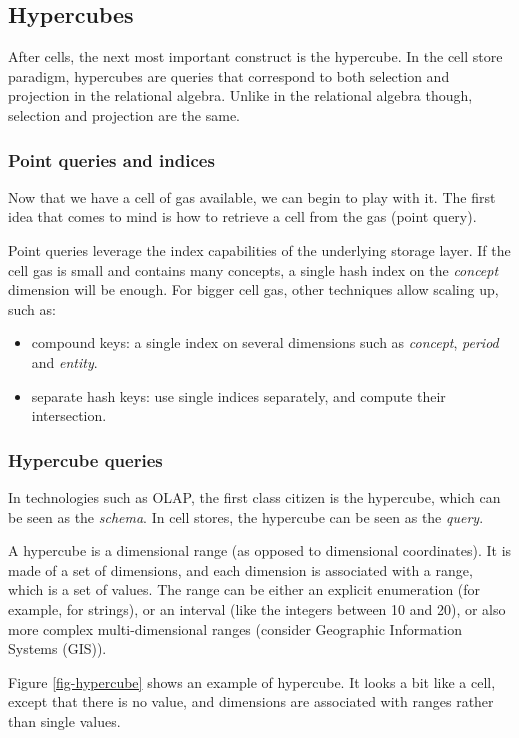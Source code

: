 \documentclass{acm_proc_article-sp}
\begin{document}
\subsection{Hypercubes}

After cells, the next most important construct is the hypercube. In the cell store paradigm, hypercubes are queries that correspond to both selection and projection in the relational algebra. Unlike in the relational algebra though, selection and projection are the same.

\subsubsection{Point queries and indices}

Now that we have a cell of gas available, we can begin to play with it. The first idea that comes to mind is how to retrieve a cell from the gas (point query).

Point queries leverage the index capabilities of the underlying storage layer. If the cell gas is small and contains many concepts, a single hash index on the \emph{concept} dimension will be enough. For bigger cell gas, other techniques allow scaling up, such as:
\begin{itemize}
\item compound keys: a single index on several dimensions such as \emph{concept}, \emph{period} and \emph{entity}.
\item separate hash keys: use single indices separately, and compute their intersection.
\end{itemize}

\subsubsection{Hypercube queries}
In technologies such as OLAP, the first class citizen is the hypercube, which can be seen as the \emph{schema}. In cell stores, the hypercube can be seen as the \emph{query}.

A hypercube is a dimensional range (as opposed to dimensional coordinates). It is made of a set of dimensions, and each dimension is associated with a range, which is a set of values. The range can be either an explicit enumeration (for example, for strings), or an interval (like the integers between 10 and 20), or also more complex multi-dimensional ranges (consider Geographic Information Systems (GIS)).

Figure \ref{fig-hypercube} shows an example of hypercube. It looks a bit like a cell, except that there is no value, and dimensions are associated with ranges rather than single values.
\end{document}
